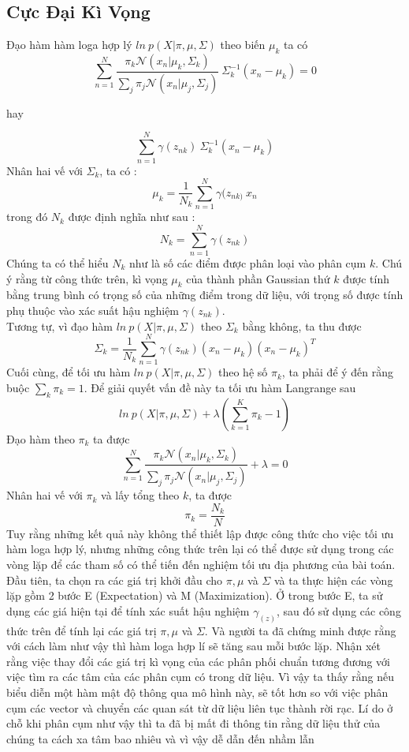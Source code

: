 \documentclass[13pt]{extreport}
\begin{document}
\subsection{Cực Đại Kì Vọng}
Đạo hàm hàm loga hợp lý $ln \ p(X| \pi, \mu, \Sigma)$ theo biến $\mu_k$ ta có
$$\sum_{n=1}^{N} \frac{\pi_k \mathcal{N}(x_n| \mu_k, \Sigma_k)}{\sum_j \pi_j \mathcal{N}(x_n | \mu_j, \Sigma_j)} \ \Sigma_{k}^{-1}(x_n - \mu_k) = 0 $$
\begin{center}
hay
\end{center}
$$\sum_{n=1}^{N} \gamma(z_{nk}) \ \Sigma_{k}^{-1}(x_n - \mu_k)$$
Nhân hai vế với $\Sigma_k$, ta có :
$$\mu_k = \frac{1}{N_k} \sum_{n=1}^{N} \gamma(z_{nk)} \ x_n$$
trong đó $N_k$ được định nghĩa như sau :
$$N_k = \sum_{n=1}^{N} \gamma(z_{nk})$$
Chúng ta có thể hiểu $N_k$ như là số các điểm được phân loại vào phân cụm $k$. Chú ý rằng từ công thức trên, kì vọng $\mu_k$ của thành phần Gaussian thứ $k$ được tính bằng trung bình có trọng số của những điểm trong dữ liệu, với trọng số được tính phụ thuộc vào xác suất hậu nghiệm $\gamma(z_{nk})$. \\
Tương tự, vì đạo hàm $ln \ p(X| \pi, \mu, \Sigma)$ theo $\Sigma_k$ bằng không, ta thu được
$$\Sigma_k = \frac{1}{N_k} \sum_{n=1}^{N} \gamma(z_{nk})(x_n - \mu_k)(x_n - \mu_k)^T$$
Cuối cùng, để tối ưu hàm $ln \ p(X| \pi, \mu, \Sigma)$ theo hệ số $\pi_k$, ta phải để ý đến rằng buộc $\sum_k \pi_k = 1$. Để giải quyết vấn đề này ta tối ưu hàm Langrange sau
$$ln \ p(X| \pi, \mu, \Sigma) + \lambda (\sum_{k=1}^{K} \pi_k - 1)$$
Đạo hàm theo $\pi_k$ ta được
$$\sum_{n=1}^{N} \frac{\pi_k \mathcal{N}(x_n| \mu_k, \Sigma_k)}{\sum_j \pi_j \mathcal{N}(x_n | \mu_j, \Sigma_j)} + \lambda = 0$$
Nhân hai vế với $\pi_k$ và lấy tổng theo $k$, ta được
$$\pi_k = \frac{N_k}{N}$$
Tuy rằng những kết quả này không thể thiết lập được công thức cho việc tối ưu hàm loga hợp lý, nhưng những công thức trên lại có thể được sử dụng trong các vòng lặp để các tham số có thể tiến đến nghiệm tối ưu địa phương của bài toán.\\
Đầu tiên, ta chọn ra các giá trị khởi đầu cho $\pi, \mu$ và $\Sigma$ và ta thực hiện các vòng lặp gồm 2 bước E (Expectation) và M (Maximization). Ở trong bước E, ta sử dụng các giá hiện tại để tính xác suất hậu nghiệm $\gamma_(z)$, sau đó sử dụng các công thức trên để tính lại các giá trị $\pi, \mu$ và $\Sigma$. Và người ta đã chứng minh được rằng với cách làm như vậy thì hàm loga hợp lí sẽ tăng sau mỗi bước lặp. Nhận xét rằng việc thay đổi các giá trị kì vọng của các phân phối chuẩn tương đương với việc tìm ra các tâm của các phân cụm có trong dữ liệu. Vì vậy ta thấy rằng nếu biểu diễn một hàm mật độ thông qua mô hình này, sẽ tốt hơn so với việc phân cụm các vector và chuyển các quan sát từ dữ liệu liên tục thành rời rạc. Lí do ở chỗ khi phân cụm như vậy thì ta đã bị mất đi thông tin rằng dữ liệu thử của chúng ta cách xa tâm bao nhiêu và vì vậy dễ dẫn đến nhầm lẫn
\end{document}
